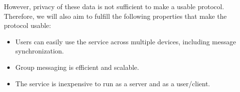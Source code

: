 However, privacy of these data is not sufficient to make a usable protocol. Therefore, we will also aim to fulfill the following properties that make the protocol usable:

\begin{itemize}
\item
  Users can easily use the service across multiple devices, including message synchronization.
\item
  Group messaging is efficient and scalable.
\item
  The service is inexpensive to run as a server and as a user/client.
\end{itemize}
